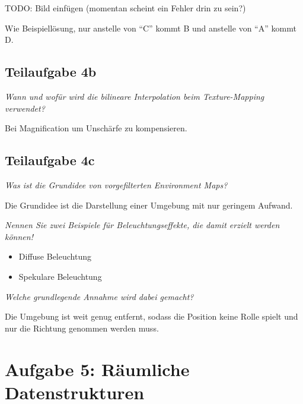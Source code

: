 \documentclass[a4paper]{scrartcl}
\begin{document}
TODO: Bild einfügen (momentan scheint ein Fehler drin zu sein?)

Wie Beispiellösung, nur anstelle von \enquote{C} kommt B und anstelle von \enquote{A}
kommt D.

\subsection*{Teilaufgabe 4b}
\textit{Wann und wofür wird die bilineare Interpolation beim Texture-Mapping verwendet?}

Bei Magnification um Unschärfe zu kompensieren.

\subsection*{Teilaufgabe 4c}
\textit{Was ist die Grundidee von vorgefilterten Environment Maps?}

Die Grundidee ist die Darstellung einer Umgebung mit nur geringem Aufwand.

\textit{Nennen Sie zwei Beispiele für Beleuchtungseffekte, die damit erzielt werden können!}

\begin{itemize}
    \item Diffuse Beleuchtung
    \item Spekulare Beleuchtung
\end{itemize}


\textit{Welche grundlegende Annahme wird dabei gemacht?}

Die Umgebung ist weit genug entfernt, sodass die Position keine Rolle spielt
und nur die Richtung genommen werden muss.

\section*{Aufgabe 5: Räumliche Datenstrukturen}
\end{document}
